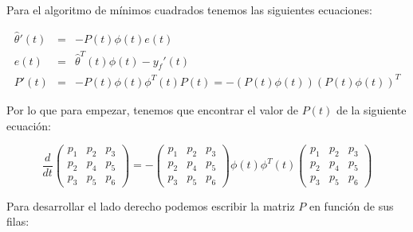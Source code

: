                 Para el algoritmo de mínimos cuadrados tenemos las siguientes ecuaciones:

                \begin{eqnarray}
                    \hat{\theta}'(t) & = & - P(t) \phi(t) e(t) \\
                    e(t) & = & \hat{\theta}^T(t) \phi(t) - y_f'(t) \\
                    P'(t) & = & - P(t) \phi(t) \phi^T(t) P(t) = - \left( P(t) \phi(t) \right) \left( P(t) \phi(t) \right)^T
                \end{eqnarray}

                Por lo que para empezar, tenemos que encontrar el valor de $P(t)$ de la siguiente ecuación:

                \begin{equation*}
                    \frac{d}{dt}
                    \begin{pmatrix}
                        p_1 & p_2 & p_3 \\
                        p_2 & p_4 & p_5 \\
                        p_3 & p_5 & p_6
                    \end{pmatrix} = -
                    \begin{pmatrix}
                        p_1 & p_2 & p_3 \\
                        p_2 & p_4 & p_5 \\
                        p_3 & p_5 & p_6
                    \end{pmatrix} \phi(t) \phi^T(t)
                    \begin{pmatrix}
                        p_1 & p_2 & p_3 \\
                        p_2 & p_4 & p_5 \\
                        p_3 & p_5 & p_6
                    \end{pmatrix}
                \end{equation*}

                Para desarrollar el lado derecho podemos escribir la matriz $P$ en función de sus filas:

